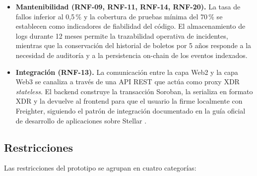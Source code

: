 \begin{itemize}
    \item \textbf{Mantenibilidad (RNF-09, RNF-11, RNF-14, RNF-20).} La tasa de fallos inferior al 0{,}5\,\% y la 
    cobertura de pruebas mínima del 70\,\% se establecen como indicadores de fiabilidad del código. El almacenamiento 
    de logs durante 12 meses permite la trazabilidad operativa de incidentes, mientras que la conservación
del historial 
    de boletos por 5 años responde a la necesidad de auditoría y a la persistencia on-chain de los eventos
indexados.

    \item \textbf{Integración (RNF-13).} La comunicación entre la capa Web2 y la capa Web3 se canaliza a
través de una 
    API REST que actúa como proxy XDR \textit{stateless}. El backend construye la transacción Soroban, la
serializa en 
    formato XDR y la devuelve al frontend para que el usuario la firme localmente con Freighter, siguiendo el
patrón de 
    integración documentado en la guía oficial de desarrollo de aplicaciones sobre Stellar
\cite{sdf2024developers}.
\end{itemize}

\subsection{Restricciones}

Las restricciones del prototipo se agrupan en cuatro categorías:

